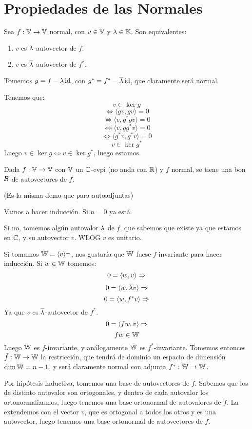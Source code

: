 \documentclass{article}
\begin{document}
\section*{Propiedades de las Normales}
\begin{teo}
    Sea $f : \mathbb{V} \to \mathbb{V}$ normal, con $v \in \mathbb{V}$ y $\lambda \in \mathbb{K}$. Son equivalentes:
    \begin{enumerate}
        \item $v$ es $\lambda$-autovector de $f$.
        \item $v$ es $\overline {\lambda}$-autovector de $f^*$.
    \end{enumerate}
\end{teo}
\begin{demo}
    Tomemos $g = f - \lambda \operatorname{id}$, con $g^* = f^* - \overline {\lambda} \operatorname{id}$, que claramente será normal.

    Tenemos que:
    \[v \in \ker g\]
    \[\iff \langle gv, gv\rangle = 0\]
    \[\iff \langle v, g^*gv\rangle = 0\]
    \[\iff \langle v, gg^*v\rangle = 0\]
    \[\iff \langle g^*v, g^*v\rangle = 0\]
    \[v \in \ker g^*\]
    Luego $v \in \ker g \iff v \in \ker g^*$, luego estamos.
\end{demo}
\begin{teo}
    Dada $f : \mathbb{V} \to \mathbb{V}$ con $\mathbb{V}$ un $\mathbb{C}$-evpi (no anda con $\mathbb{R}$) y $f$ normal, se tiene una bon $\mathcal{B}$ de autovectores de $f$.
\end{teo}
\begin{demo}
    (Es la misma demo que para autoadjuntas)

    Vamos a hacer inducción. Si $n = 0$ ya está.

    Si no, tomemos algún autovalor $\lambda$ de $f$, que sabemos que existe ya que estamos en $\mathbb{C}$, y su autovector $v$. WLOG $v$ es unitario.

    Si tomamos $\mathbb{W} = \langle v \rangle ^\perp$, nos gustaría que $\mathbb{W}$ fuese $f$-invariante para hacer inducción. Si $w \in \mathbb{W}$ tomemos:
    \[0 = \langle w, v\rangle \Rightarrow\]
    \[0 = \langle w, \overline {\lambda} v\rangle \Rightarrow\]
    \[0 = \langle w, f^*v\rangle \Rightarrow\]
    Ya que $v$ es $\overline {\lambda}$-autovector de $f^*$.
    \[0 = \langle fw, v\rangle \Rightarrow\]
    \[fw \in \mathbb{W}\]
    Luego $\mathbb{W}$ es $f$-invariante, y análogamente $\mathbb{W}$ es $f^*$-invariante. Tomemos entonces $\tilde f : \mathbb{W} \to \mathbb{W}$ la restricción, que tendrá de dominio un espacio de dimensión $\dim \mathbb{W} = n-1$, y será claramente normal con adjunta $\tilde {f^*} : \mathbb{W} \to \mathbb{W}$.

    Por hipótesis inductiva, tomemos una base de autovectores de $\tilde f$. Sabemos que los de distinto autovalor son ortogonales, y dentro de cada autovalor los ortonormalizamos, luego tenemos una base ortonormal de autovalores de $\tilde f$. La extendemos con el vector $v$, que es ortogonal a todos los otros y es una autovector, luego tenemos una base ortonormal de autovectores de $f$.
\end{demo}
\end{document}
